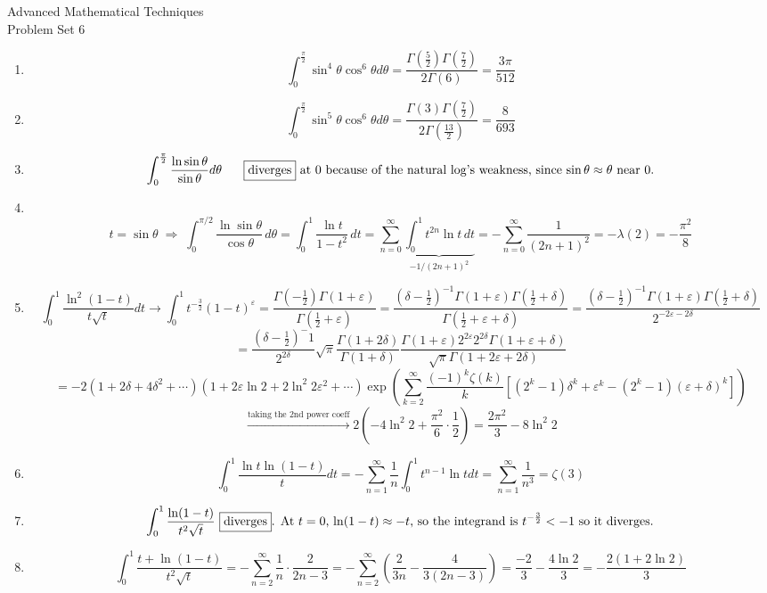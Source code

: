 \documentclass{article}
\begin{document}
\thispagestyle{fancy}
\begin{center}\LARGE{Advanced Mathematical Techniques \\ Problem Set 6}\end{center}
\vspace{10mm}
\begin{enumerate}
    \item \[\int_{0}^{\frac{\pi}{2}}\sin^4\theta \cos^6\theta d\theta = \frac{\Gamma(\frac 5 2)\Gamma(\frac 7 2)}{2\Gamma(6)} = \boxed{\frac {3\pi}{512}}\]
    \item \[\int_{0}^{\frac{\pi}{2}}\sin^5 \theta \cos^6 \theta d\theta = \frac{\Gamma(3)\Gamma(\frac 7 2)}{2\Gamma(\frac {13}2)} = \boxed{\frac{8}{693}}\]
    \item \[\int_{0}^{\frac{\pi}{2}}\frac{\ln\sin\theta}{\sin\theta}d\theta \text{ \hspace{5mm}\boxed{\text{diverges}} at 0 because of the natural log's weakness, since $\sin\theta \approx \theta$ near 0.}\]
    \item \ \[t = \sin\theta \;\Longrightarrow\;
    \int_{0}^{\pi/2}\frac{\ln\sin\theta}{\cos\theta}\,d\theta
    = \int_0^1 \frac{\ln t}{1-t^2}\,dt
    = \sum_{n=0}^{\infty}\underbrace{\int_0^1 t^{2n}\ln t\,dt}_{-1/(2n+1)^2}
    = -\sum_{n=0}^{\infty}\frac{1}{(2n+1)^2}
    = -\lambda(2) = \boxed{-\frac{\pi^2}{8}}\]
    \item \[\int_{0}^{1}\frac{\ln^2(1-t)}{t\sqrt t}dt \rightarrow \int_{0}^{1} t^{-\frac 3 2}(1-t)^\varepsilon = \frac{\Gamma(-\frac 1 2)\Gamma(1+\varepsilon)}{\Gamma(\frac{1}{2} + \varepsilon)} = \frac{(\delta - \frac 1 2)^{-1}\Gamma(1+\varepsilon)\Gamma(\frac 1 2 + \delta)}{\Gamma(\frac 1 2 + \varepsilon + \delta)} = \frac{(\delta - \frac 1 2)^{-1}\Gamma(1+\varepsilon)\Gamma(\frac 1 2 + \delta)}{2^{-2\varepsilon-2\delta}}\]
    \[ = \frac{(\delta - \frac 1 2)^-1}{2^{2\delta}}\sqrt{\pi}\frac{\Gamma(1+2\delta)}{\Gamma(1+\delta)}\frac{\Gamma(1+\varepsilon)2^{2\varepsilon}2^{2\delta}\Gamma(1+\varepsilon+\delta)}{\sqrt{\pi}\Gamma(1+2\varepsilon+2\delta)} \]\[= -2(1+2\delta+4\delta^2+\cdots)(1+2\varepsilon\ln 2 + 2\ln^2 2 \varepsilon^2 + \cdots)\exp(\sum_{k=2}^{\infty}\frac{(-1)^k\zeta(k)}{k}\left[ (2^k-1)\delta^k + \varepsilon^k - (2^k-1)(\varepsilon+\delta)^k\right]) \]\[\xrightarrow{\text{taking the 2nd power coeff}}2\left(-4\ln^2 2 + \frac{\pi^2}{6}\cdot \frac 1 2 \right) = \boxed{\frac{2\pi^2}{3}-8\ln^2 2}\]
    \item \[\int_{0}^{1}\frac{\ln t \ln(1-t)}{t}dt = -\sum_{n=1}^{\infty} \frac 1 n \int_{0}^{1} t^{n-1}\ln tdt = \sum_{n=1}^{\infty} \frac 1 {n^3} = \boxed{\zeta(3)}\]
    \item \[\int_{0}^{1}\frac{\ln(1-t)}{t^2\sqrt t} \text{ \boxed{\text{diverges}}. At $t=0$, $\ln(1-t) \approx -t$, so the integrand is $t^{-\frac 3 2} < -1$ so it diverges.}\]
    \item \[\int_{0}^{1} \frac{t + \ln(1-t)}{t^2\sqrt t} = -\sum_{n=2}^{\infty} \frac 1 n \cdot \frac 2 {2n-3} = -\sum_{n=2}^{\infty} \left( \frac{2}{3n} - \frac{4}{3(2n-3)}\right) = \frac{-2}{3} - \frac{4\ln 2}{3} = \boxed{-\frac{2(1+2\ln 2)}{3}}\]
\end{enumerate}
\end{document}
